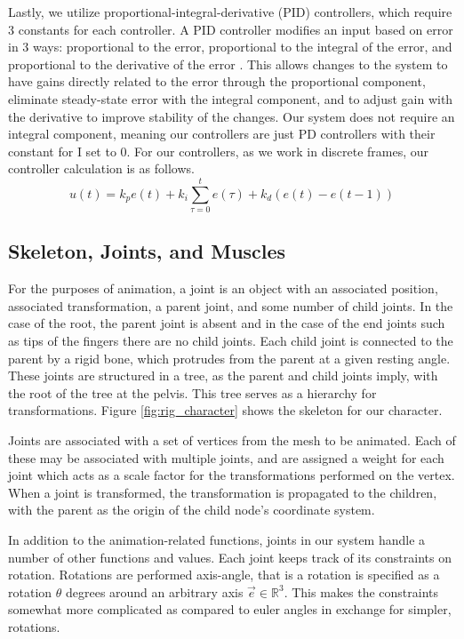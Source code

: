 Lastly, we utilize proportional-integral-derivative (PID) controllers, which require 3 constants for each controller.  A PID controller modifies an input based on error in 3 ways: proportional to the error, proportional to the integral of the error, and proportional to the derivative of the error \cite{pid}.  This allows changes to the system to have gains directly related to the error through the proportional component, eliminate steady-state error with the integral component, and to adjust gain with the derivative to improve stability of the changes.  Our system does not require an integral component, meaning our controllers are just PD controllers with their constant for I set to 0.  For our controllers, as we work in discrete frames, our controller calculation is as follows.
\[
	u(t) = k_p e(t) + k_i \displaystyle\sum_{\tau = 0}^t e(\tau) + k_d \left( e(t) - e(t-1) \right)
\]


\subsection{Skeleton, Joints, and Muscles}
\label{subsection:skel_joints}

For the purposes of animation, a joint is an object with an associated position, associated transformation, a parent joint, and some number of child joints.  In the case of the root, the parent joint is absent and in the case of the end joints such as tips of the fingers there are no child joints.  Each child joint is connected to the parent by a rigid bone, which protrudes from the parent at a given resting angle.  These joints are structured in a tree, as the parent and child joints imply, with the root of the tree at the pelvis.  This tree serves as a hierarchy for transformations.  Figure \ref{fig:rig_character} shows the skeleton for our character.

Joints are associated with a set of vertices from the mesh to be animated.  Each of these may be associated with multiple joints, and are assigned a weight for each joint which acts as a scale factor for the transformations performed on the vertex.  When a joint is transformed, the transformation is propagated to the children, with the parent as the origin of the child node's coordinate system.

In addition to the animation-related functions, joints in our system handle a number of other functions and values.  Each joint keeps track of its constraints on rotation.  Rotations are performed axis-angle, that is a rotation is specified as a rotation $\theta$ degrees around an arbitrary axis $\vec{e} \in \mathbb{R}^3$. This makes the constraints somewhat more complicated as compared to euler angles in exchange for simpler, rotations.  

